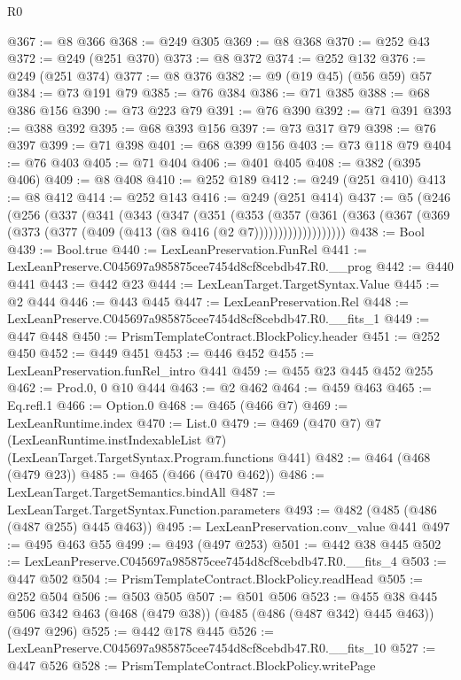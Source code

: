 \begin{lexlean}{R0}
\begin{coremodule}
@367 := @8 @366
@368 := @249 @305
@369 := @8 @368
@370 := @252 @43
@372 := @249 (@251 @370)
@373 := @8 @372
@374 := @252 @132
@376 := @249 (@251 @374)
@377 := @8 @376
@382 := @9 (@19 @45) (@56 @59) @57
@384 := @73 @191 @79
@385 := @76 @384
@386 := @71 @385
@388 := @68 @386 @156
@390 := @73 @223 @79
@391 := @76 @390
@392 := @71 @391
@393 := @388 @392
@395 := @68 @393 @156
@397 := @73 @317 @79
@398 := @76 @397
@399 := @71 @398
@401 := @68 @399 @156
@403 := @73 @118 @79
@404 := @76 @403
@405 := @71 @404
@406 := @401 @405
@408 := @382 (@395 @406)
@409 := @8 @408
@410 := @252 @189
@412 := @249 (@251 @410)
@413 := @8 @412
@414 := @252 @143
@416 := @249 (@251 @414)
@437 := @5
    (@246
      (@256
        (@337
          (@341
            (@343
              (@347
                (@351
                  (@353
                    (@357
                      (@361
                        (@363 (@367 (@369 (@373 (@377 (@409 (@413 (@8 @416 (@2 @7)))))))))))))))))))
@438 := Bool
@439 := Bool.true
@440 := LexLeanPreservation.FunRel
@441 := LexLeanPreserve.C045697a985875cee7454d8cf8cebdb47.R0.__prog
@442 := @440 @441
@443 := @442 @23
@444 := LexLeanTarget.TargetSyntax.Value
@445 := @2 @444
@446 := @443 @445
@447 := LexLeanPreservation.Rel
@448 := LexLeanPreserve.C045697a985875cee7454d8cf8cebdb47.R0.__fits_1
@449 := @447 @448
@450 := PrismTemplateContract.BlockPolicy.header
@451 := @252 @450
@452 := @449 @451
@453 := @446 @452
@455 := LexLeanPreservation.funRel_intro @441
@459 := @455 @23 @445 @452 @255
@462 := Prod.{0, 0} @10 @444
@463 := @2 @462
@464 := @459 @463
@465 := Eq.refl.{1}
@466 := Option.{0}
@468 := @465 (@466 @7)
@469 := LexLeanRuntime.index
@470 := List.{0}
@479 := @469
    (@470 @7)
    @7
    (LexLeanRuntime.instIndexableList @7)
    (LexLeanTarget.TargetSyntax.Program.functions @441)
@482 := @464 (@468 (@479 @23))
@485 := @465 (@466 (@470 @462))
@486 := LexLeanTarget.TargetSemantics.bindAll
@487 := LexLeanTarget.TargetSyntax.Function.parameters
@493 := @482 (@485 (@486 (@487 @255) @445 @463))
@495 := LexLeanPreservation.conv_value @441
@497 := @495 @463 @55
@499 := @493 (@497 @253)
@501 := @442 @38 @445
@502 := LexLeanPreserve.C045697a985875cee7454d8cf8cebdb47.R0.__fits_4
@503 := @447 @502
@504 := PrismTemplateContract.BlockPolicy.readHead
@505 := @252 @504
@506 := @503 @505
@507 := @501 @506
@523 := @455
    @38
    @445
    @506
    @342
    @463
    (@468 (@479 @38))
    (@485 (@486 (@487 @342) @445 @463))
    (@497 @296)
@525 := @442 @178 @445
@526 := LexLeanPreserve.C045697a985875cee7454d8cf8cebdb47.R0.__fits_10
@527 := @447 @526
@528 := PrismTemplateContract.BlockPolicy.writePage

\end{coremodule}
\end{lexlean}
